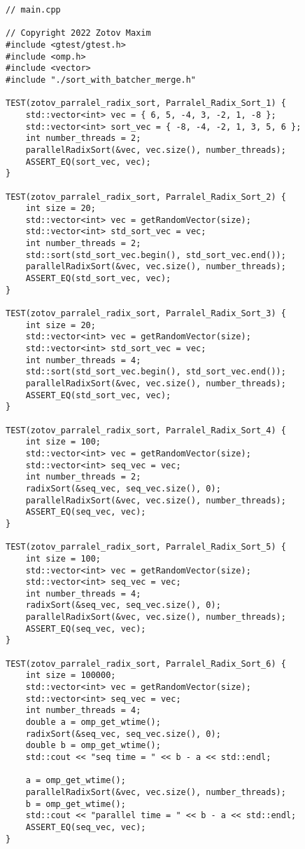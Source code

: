 \documentclass{report}
\begin{document}
\begin{lstlisting}
// main.cpp

// Copyright 2022 Zotov Maxim
#include <gtest/gtest.h>
#include <omp.h>
#include <vector>
#include "./sort_with_batcher_merge.h"

TEST(zotov_parralel_radix_sort, Parralel_Radix_Sort_1) {
    std::vector<int> vec = { 6, 5, -4, 3, -2, 1, -8 };
    std::vector<int> sort_vec = { -8, -4, -2, 1, 3, 5, 6 };
    int number_threads = 2;
    parallelRadixSort(&vec, vec.size(), number_threads);
    ASSERT_EQ(sort_vec, vec);
}

TEST(zotov_parralel_radix_sort, Parralel_Radix_Sort_2) {
    int size = 20;
    std::vector<int> vec = getRandomVector(size);
    std::vector<int> std_sort_vec = vec;
    int number_threads = 2;
    std::sort(std_sort_vec.begin(), std_sort_vec.end());
    parallelRadixSort(&vec, vec.size(), number_threads);
    ASSERT_EQ(std_sort_vec, vec);
}

TEST(zotov_parralel_radix_sort, Parralel_Radix_Sort_3) {
    int size = 20;
    std::vector<int> vec = getRandomVector(size);
    std::vector<int> std_sort_vec = vec;
    int number_threads = 4;
    std::sort(std_sort_vec.begin(), std_sort_vec.end());
    parallelRadixSort(&vec, vec.size(), number_threads);
    ASSERT_EQ(std_sort_vec, vec);
}

TEST(zotov_parralel_radix_sort, Parralel_Radix_Sort_4) {
    int size = 100;
    std::vector<int> vec = getRandomVector(size);
    std::vector<int> seq_vec = vec;
    int number_threads = 2;
    radixSort(&seq_vec, seq_vec.size(), 0);
    parallelRadixSort(&vec, vec.size(), number_threads);
    ASSERT_EQ(seq_vec, vec);
}

TEST(zotov_parralel_radix_sort, Parralel_Radix_Sort_5) {
    int size = 100;
    std::vector<int> vec = getRandomVector(size);
    std::vector<int> seq_vec = vec;
    int number_threads = 4;
    radixSort(&seq_vec, seq_vec.size(), 0);
    parallelRadixSort(&vec, vec.size(), number_threads);
    ASSERT_EQ(seq_vec, vec);
}

TEST(zotov_parralel_radix_sort, Parralel_Radix_Sort_6) {
    int size = 100000;
    std::vector<int> vec = getRandomVector(size);
    std::vector<int> seq_vec = vec;
    int number_threads = 4;
    double a = omp_get_wtime();
    radixSort(&seq_vec, seq_vec.size(), 0);
    double b = omp_get_wtime();
    std::cout << "seq time = " << b - a << std::endl;

    a = omp_get_wtime();
    parallelRadixSort(&vec, vec.size(), number_threads);
    b = omp_get_wtime();
    std::cout << "parallel time = " << b - a << std::endl;
    ASSERT_EQ(seq_vec, vec);
}


\end{lstlisting}
\end{document}
